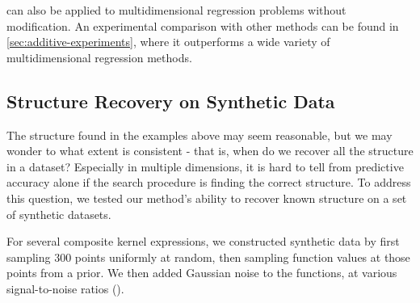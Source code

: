 \procedurename{} can also be applied to multidimensional regression problems without modification.
An experimental comparison with other methods can be found in \cref{sec:additive-experiments}, where it outperforms a wide variety of multidimensional regression methods.



\subsection{Structure Recovery on Synthetic Data}
\label{sec:synthetic}

The structure found in the examples above may seem reasonable, but we may wonder to what extent \procedurename{} is consistent - that is, when do we recover all the structure in a dataset?
Especially in multiple dimensions, it is hard to tell from predictive accuracy alone if the search procedure is finding the correct structure.
To address this question, we tested our method's ability to recover known structure on a set of synthetic datasets.

For several composite kernel expressions, we constructed synthetic data by first sampling 300 points uniformly at random, then sampling function values at those points from a \gp{} prior.
We then added \iid Gaussian noise to the functions, at various signal-to-noise ratios (\SNR{}).


